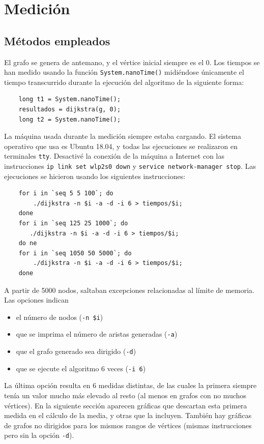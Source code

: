 \documentclass[12pt , a4paper]{article}
\begin{document}
\section{Medición}
\subsection{Métodos empleados}
	El grafo se genera de antemano, y el vértice inicial siempre es el 0. Los tiempos se han medido usando la función \texttt{System.nanoTime()} midiéndose únicamente el tiempo transcurrido durante la ejecución del algoritmo de la siguiente forma:
	\begin{verbatim}
	long t1 = System.nanoTime();
	resultados = dijkstra(g, 0);
	long t2 = System.nanoTime();
	\end{verbatim}
	
	La máquina usada durante la medición siempre estaba cargando. El sistema operativo que usa es Ubuntu 18.04, y todas las ejecuciones se realizaron en terminales \texttt{tty}. Desactivé la conexión de la máquina a Internet con las instrucciones \texttt{ip link set wlp2s0 down} y \texttt{service network-manager stop}. Las ejecuciones se hicieron usando los siguientes instrucciones:
	\begin{verbatim}
	for i in `seq 5 5 100`; do 
	    ./dijkstra -n $i -a -d -i 6 > tiempos/$i; 
	done
	for i in `seq 125 25 1000`; do 
	   ./dijkstra -n $i -a -d -i 6 > tiempos/$i;
	do ne
	for i in `seq 1050 50 5000`; do 
	    ./dijkstra -n $i -a -d -i 6 > tiempos/$i; 
	done
	\end{verbatim}
	A partir de 5000 nodos, saltaban excepciones relacionadas al límite de memoria. Las opciones indican
	\begin{itemize}
		\item el número de nodos (\texttt{-n \$i})
		\item que se imprima el número de aristas generadas (\texttt{-a})
		\item que el grafo generado sea dirigido (\texttt{-d})
		\item que se ejecute el algoritmo 6 veces (\texttt{-i 6})
	\end{itemize} 
	La última opción resulta en 6 medidas distintas, de las cuales la primera siempre tenía un valor mucho más elevado al resto (al menos en grafos con no muchos vértices). En la siguiente sección aparecen gráficas que descartan esta primera medida en el cálculo de la media, y otras que la incluyen. También hay gráficas de grafos no dirigidos para los mismos rangos de vértices (mismas instrucciones pero sin la opción \texttt{-d}).
	
\end{document}
